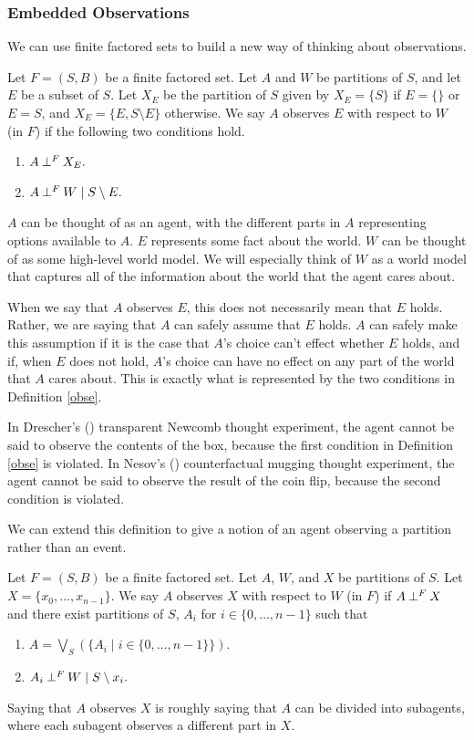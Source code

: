 \documentclass[authordate,onecolumn]{miri-tech-article}
\begin{document}
\subsubsection{Embedded Observations}
We can use finite factored sets to build a new way of thinking about observations.

\begin{definition}\label{obse}
Let $F=(S,B)$ be a finite factored set. Let $A$ and $W$ be partitions of $S$, and let $E$ be a subset of $S$. 
Let $X_E$ be the partition of $S$ given by $X_E=\{S\}$ if $E=\{\}$ or $E=S$, and $X_E=\{E,S\setminus E\}$ otherwise.
We say $A$ observes $E$ with respect to $W$ (in $F$) if the following two conditions hold.
\begin{enumerate}
    \item $A\mathbin{\perp^{F}}X_E.$
    \item $A\mathbin{\perp^{F}}W\mid S\setminus E.$
\end{enumerate}
\end{definition}
$A$ can be thought of as an agent, with the different parts in $A$ representing options available to $A$. $E$ represents some fact about the world. $W$ can be thought of as some high-level world model. We will especially think of $W$ as a world model that captures all of the information about the world that the agent cares about.

When we say that $A$ observes $E$, this does not necessarily mean that $E$ holds. Rather, we are saying that $A$ can safely assume that $E$ holds. $A$ can safely make this assumption if it is the case that $A$'s choice can't effect whether $E$ holds, and if, when $E$ does not hold,  $A$'s choice can have no effect on any part of the world that $A$ cares about. This is exactly what is represented by the two conditions in Definition \ref{obse}.

In Drescher's (\citeyear{Drescher:2006}) transparent Newcomb thought experiment, the agent cannot be said to observe the contents of the box, because the first condition in Definition \ref{obse} is violated. In Nesov's (\citeyear{Nesov:2009}) counterfactual mugging thought experiment, the agent cannot be said to observe the result of the coin flip, because the second condition is violated.

We can extend this definition to give a notion of an agent observing a partition rather than an event. 

\begin{definition}\label{obsp}
Let $F=(S,B)$ be a finite factored set. Let $A$, $W$, and $X$ be partitions of $S$. Let $X=\{x_0,\dots, x_{n-1}\}$. 
We say $A$ observes $X$ with respect to $W$ (in $F$) if $A\mathbin{\perp^{F}}X$ and there exist partitions of $S$, $A_i$ for $i\in \{0,\dots,n-1\}$ such that
\begin{enumerate}
    \item $A=\bigvee_S(\{A_i\mid i\in \{0,\dots,n-1\}\})$.
    \item $A_i\mathbin{\perp^{F}}W\mid S\setminus x_i.$
\end{enumerate}
\end{definition}
Saying that $A$ observes $X$ is roughly saying that $A$ can be divided into subagents, where each subagent observes a different part in $X$.
\end{document}

